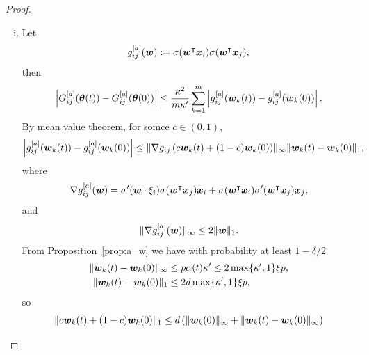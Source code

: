 \documentclass{article}
\begin{document}
\begin{proof}
\begin{enumerate}[(a)]
\begin{enumerate}[(i)]
                  \item Let
                        \begin{equation}
                            g^{[a]}_{ij}(\bm{w}) := \sigma(\bm{w}^\intercal\bm{x}_i)\sigma(\bm{w}^\intercal\bm{x}_j),
                        \end{equation}
                        then
                        \begin{equation}
                            \left\lvert G_{ij}^{[a]}(\bm{\theta}(t)) - G_{ij}^{[a]}(\bm{\theta}(0))\right\rvert \leq \frac{\kappa^2}{m\kappa'}\sum_{k=1}^m \left\lvert g^{[a]}_{ij}(\bm{w}_k(t)) - g^{[a]}_{ij}(\bm{w}_k(0))\right\rvert.
                        \end{equation}
                        By mean value theorem, for somce $c\in(0,1)$,
                        \begin{equation}
                            \left\lvert g^{[a]}_{ij}(\bm{w}_k(t)) - g^{[a]}_{ij}(\bm{w}_k(0))\right\rvert \leq \lVert\nabla g_{ij}\left(c\bm{w}_k(t) + (1-c)\bm{w}_k(0)\right)\rVert_{\infty}\lVert\bm{w}_k(t) - \bm{w}_k(0)\rVert_1,
                        \end{equation}
                        where
                        \begin{equation}
                            \nabla g_{ij}^{[a]}(\bm{w})=\sigma'(\bm{w}\cdot\xi_i)\sigma(\bm{w}^\intercal\bm{x}_j)\bm{x}_i+\sigma(\bm{w}^\intercal\bm{x}_i)\sigma'(\bm{w}^\intercal\bm{x}_j)\bm{x}_j,
                        \end{equation}
                        and
                        \begin{equation}
                            \lVert\nabla g_{ij}^{[a]}(\bm{w})\rVert_{\infty}\leq 2\lVert\bm{w}\rVert_1.
                        \end{equation}
                        From Proposition~\ref{prop:a_w} we have with probability at least $1-\delta/2$
                        \begin{align}
                            \lVert\bm{w}_k(t)-\bm{w}_k(0)\rVert_{\infty} & \leq p\alpha(t)\kappa'\leq 2\max\{\kappa',1\}\xi p, \\
                            \lVert\bm{w}_k(t)-\bm{w}_k(0)\rVert_1        & \leq 2d\max\{\kappa',1\}\xi p,
                        \end{align}
                        so
                        \begin{equation}
                            \begin{aligned}
                                \norm{c\vw_k(t) + (1-c)\vw_k(0)}_1
                                 & \leq d\left(\norm{\vw_k(0)}_{\infty} + \norm{\vw_k(t) - \vw_k(0)}_{\infty}\right) \\

\end{aligned}
\end{equation}
\end{enumerate}
\end{enumerate}
\end{proof}
\end{document}
